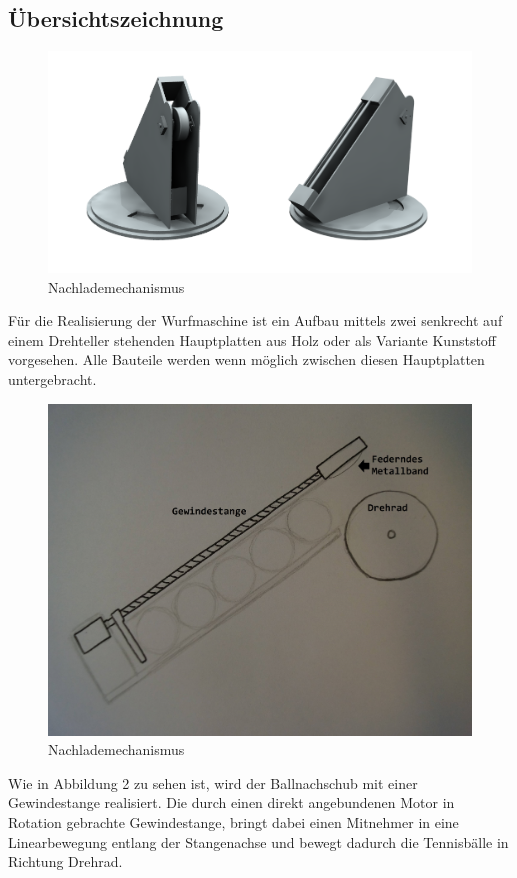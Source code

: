 \subsection{Übersichtszeichnung}

\begin{figure}[h!]
	\centering
	\includegraphics[scale=0.5]{../../fig/Studio.png}
	\caption{Nachlademechanismus}
\end{figure}
Für die Realisierung der Wurfmaschine ist ein Aufbau mittels zwei senkrecht auf einem Drehteller stehenden Hauptplatten aus Holz oder als Variante Kunststoff vorgesehen. Alle Bauteile werden wenn möglich zwischen diesen Hauptplatten untergebracht.
\begin{figure}[h!]
	\centering
	\includegraphics[scale=0.35]{../../fig/Ballnachlader.jpg}
	\caption{Nachlademechanismus}
\end{figure}
Wie in Abbildung 2 zu sehen ist, wird der Ballnachschub mit einer Gewindestange realisiert. Die durch einen direkt angebundenen Motor in Rotation gebrachte Gewindestange, bringt dabei einen Mitnehmer in eine Linearbewegung entlang der Stangenachse und bewegt dadurch die Tennisbälle in Richtung Drehrad.
